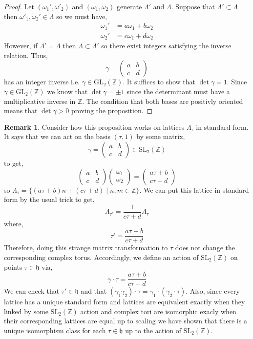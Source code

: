 \documentclass{article}
\newcommand{\SL}[0]{\mathrm{SL}}
\newcommand{\GL}[2]{\mathrm{GL}_{#1}\left(#2\right)}
\newcommand{\Z}{\mathbb{Z}}
\theoremstyle{definition}
\newtheorem{remark}{Remark}[section]
\newcommand{\h}{\mathfrak{h}}
\newcommand{\MG}{\SL_2(\Z)}
\begin{document}
\begin{proof}
Let $(\omega_1', \omega'_2)$ and $(\omega_1, \omega_2)$ generate $\Lambda'$ and $\Lambda$. Suppose that $\Lambda' \subset \Lambda$ then $\omega'_1, \omega_2' \in \Lambda$ so we must have,
\begin{align*}
\omega_1' & = a \omega_1 + b \omega_2
\\
\omega_2' & = c \omega_1 + d \omega_2 
\end{align*}
However, if $\Lambda' = \Lambda$ then $\Lambda \subset \Lambda'$ so there exist integers satisfying the inverse relation. Thus,
\[ \gamma = \begin{pmatrix}
a & b 
\\
c & d
\end{pmatrix} \] 
has an integer inverse i.e. $\gamma \in \GL{2}{\Z}$. It suffices to show that $\det{\gamma} = 1$. Since $\gamma \in \GL{2}{\Z}$ we know that $\det{\gamma} = \pm 1$ since the determinant must have a multiplicative inverse in $\Z$. The condition that both bases are positivly oriented means that $\det{\gamma} > 0$ proving the proposition. 
\end{proof}

\begin{remark}
Consider how this proposition works on lattices $\Lambda_{\tau}$ in standard form. It says that we can act on the basis $(\tau, 1)$ by some matrix,
\[ \gamma = \begin{pmatrix}
a & b 
\\
c & d
\end{pmatrix} \in \MG \]
to get,
\[ \begin{pmatrix}
a & b 
\\
c & d
\end{pmatrix}
 \begin{pmatrix}
\omega_1
\\
\omega_2
\end{pmatrix}
= \begin{pmatrix}
a \tau + b 
\\
c \tau + d
\end{pmatrix} \]
so $\Lambda_{\tau} = \{ (a \tau + b) n + (c \tau + d) \mid n, m \in \Z \}$. We can put this lattice in standard form by the usual trick to get,
\[ \Lambda_{\tau'} = \frac{1}{c \tau + d} \Lambda_{\tau} \]
where,
\[ \tau' = \frac{a \tau + b}{c \tau + d} \]
Therefore, doing this strange matrix transformation to $\tau$ does not change the corresponding complex torus. 
Accordingly, we define an action of $\MG$ on points $\tau \in \h$ via,
\[ \gamma \cdot \tau = \frac{a \tau + b}{c \tau + d} \]
We can check that $\tau' \in \h$ and that $(\gamma_1 \gamma_2) \cdot \tau = \gamma_1 \cdot (\gamma_2 \cdot \tau)$. 
Also, since every lattice has a unique standard form and lattices are equivalent exactly when they linked by some $\MG$ action and complex tori are isomorphic exacly when their corresponding lattices are equal up to scaling we have shown that there is a unique isomorphism class for each $\tau \in \h$ up to the action of $\MG$.
\end{remark} 
\end{document}
